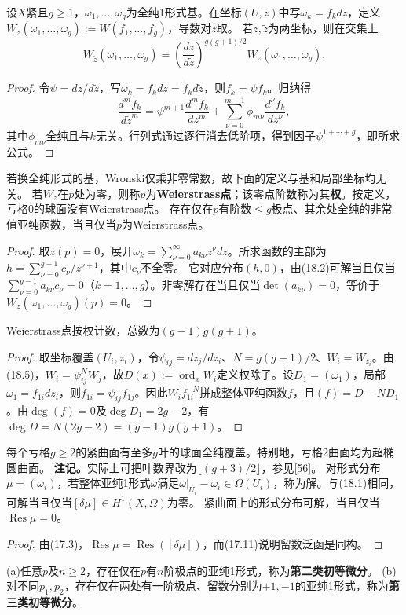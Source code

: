 设$X$紧且$g\ge1$，$\omega_1,\ldots,\omega_g$为全纯1形式基。在坐标$(U,z)$中写$\omega_k=f_kdz$，定义$W_z(\omega_1,\ldots,\omega_g):=W(f_1,\ldots,f_g)$，导数对$z$取。
若$z,\widetilde z$为两坐标，则在交集上
\[
W_{\widetilde z}(\omega_1,\ldots,\omega_g)=\left(\frac{dz}{d\widetilde z}\right)^{g(g+1)/2}W_z(\omega_1,\ldots,\omega_g).
\]
\begin{proof}
令$\psi=dz/d\widetilde z$，写$\omega_k=f_kdz=\widetilde f_kd\widetilde z$，则$\widetilde f_k=\psi f_k$。归纳得
\[
\frac{d^m\widetilde f_k}{d\widetilde z^m}=\psi^{m+1}\frac{d^mf_k}{dz^m}+\sum_{\nu=0}^{m-1}\phi_{m\nu}\frac{d^\nu f_k}{dz^\nu},
\]
其中$\phi_{m\nu}$全纯且与$k$无关。行列式通过逐行消去低阶项，得到因子$\psi^{1+\cdots+g}$，即所求公式。
\end{proof}
若换全纯形式的基，Wronski仅乘非零常数，故下面的定义与基和局部坐标均无关。
若$W_z$在$p$处为零，则称$p$为\textbf{Weierstrass点}；该零点阶数称为其\textbf{权}。按定义，亏格0的球面没有Weierstrass点。
存在仅在$p$有阶数$\le g$极点、其余处全纯的非常值亚纯函数，当且仅当$p$为Weierstrass点。
\begin{proof}
取$z(p)=0$，展开$\omega_k=\sum_{\nu=0}^\infty a_{k\nu}z^\nu dz$。所求函数的主部为$h=\sum_{\nu=0}^{g-1}c_\nu/z^{\nu+1}$，其中$c_\nu$不全零。
它对应分布$(h,0)$，由(18.2)可解当且仅当$\sum_{\nu=0}^{g-1}a_{k\nu}c_\nu=0$（$k=1,\ldots,g$）。非零解存在当且仅当$\det(a_{k\nu})=0$，等价于$W_z(\omega_1,\ldots,\omega_g)(p)=0$。
\end{proof}
Weierstrass点按权计数，总数为$(g-1)g(g+1)$。
\begin{proof}
取坐标覆盖$(U_i,z_i)$，令$\psi_{ij}=dz_j/dz_i$、$N=g(g+1)/2$、$W_i=W_{z_i}$。由(18.5)，$W_i=\psi_{ij}^NW_j$，故$D(x):=\operatorname{ord}_xW_i$定义权除子。设$D_1=(\omega_1)$，局部$\omega_1=f_{1i}dz_i$，则$f_{1i}=\psi_{ij}f_{1j}$。因此$W_i f_{1i}^{-N}$拼成整体亚纯函数$f$，且$(f)=D-ND_1$。由$\deg(f)=0$及$\deg D_1=2g-2$，有$\deg D=N(2g-2)=(g-1)g(g+1)$。
\end{proof}
每个亏格$g\ge2$的紧曲面有至多$g$叶的球面全纯覆盖。特别地，亏格2曲面均为超椭圆曲面。
\textbf{注记。}实际上可把叶数界改为$\lfloor(g+3)/2\rfloor$，参见[56]。
对形式分布$\mu=(\omega_i)$，若整体亚纯1形式$\omega$满足$\omega|_{U_i}-\omega_i\in\Omega(U_i)$，称为解。与(18.1)相同，可解当且仅当$[\delta\mu]\in H^1(X,\Omega)$为零。
紧曲面上的形式分布可解，当且仅当$\operatorname{Res}\mu=0$。
\begin{proof}
由(17.3)，$\operatorname{Res}\mu=\operatorname{Res}([\delta\mu])$，而(17.11)说明留数泛函是同构。
\end{proof}
(a)任意$p$及$n\ge2$，存在仅在$p$有$n$阶极点的亚纯1形式，称为\textbf{第二类初等微分}。
(b)对不同$p_1,p_2$，存在仅在两处有一阶极点、留数分别为$+1,-1$的亚纯1形式，称为\textbf{第三类初等微分}。
